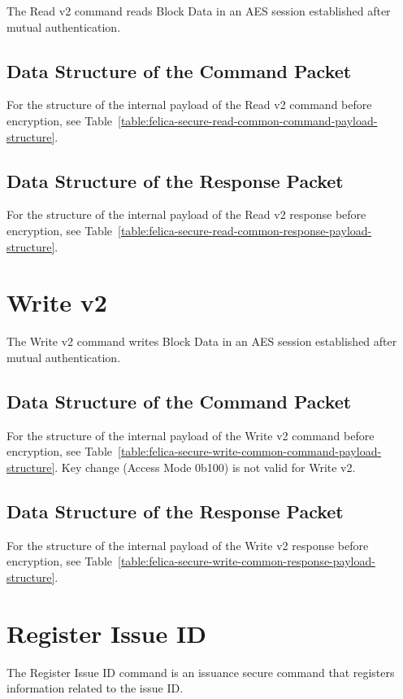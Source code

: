 \documentclass[a4paper,11pt]{report}
\begin{document}
The Read v2 command reads Block Data in an AES session established after mutual authentication.

\subsection{Data Structure of the Command Packet}

For the structure of the internal payload of the Read v2 command before encryption, see Table~\ref{table:felica-secure-read-common-command-payload-structure}.

\subsection{Data Structure of the Response Packet}

For the structure of the internal payload of the Read v2 response before encryption, see Table~\ref{table:felica-secure-read-common-response-payload-structure}.

\section{Write v2}

The Write v2 command writes Block Data in an AES session established after mutual authentication.

\subsection{Data Structure of the Command Packet}

For the structure of the internal payload of the Write v2 command before encryption, see Table~\ref{table:felica-secure-write-common-command-payload-structure}.
Key change (Access Mode 0b100) is not valid for Write v2.

\subsection{Data Structure of the Response Packet}

For the structure of the internal payload of the Write v2 response before encryption, see Table~\ref{table:felica-secure-write-common-response-payload-structure}.

\section{Register Issue ID}

The Register Issue ID command is an issuance secure command that registers information related to the issue ID.
\end{document}
